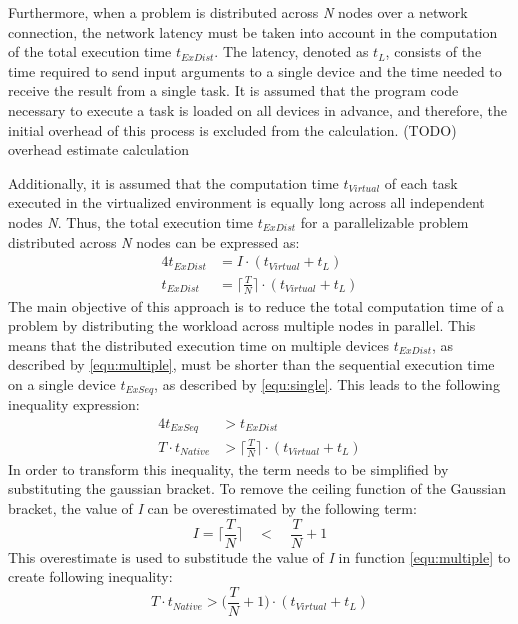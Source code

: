 Furthermore, when a problem is distributed across \emph{N} nodes over a network connection, the network latency must be taken into account in the computation of the total execution time $t_{ExDist}$. The latency, denoted as $t_{L}$, consists of the time required to send input arguments to a single device and the time needed to receive the result from a single task. It is assumed that the program code necessary to execute a task is loaded on all devices in advance, and therefore, the initial overhead of this process is excluded from the calculation. 
(TODO) overhead estimate calculation

Additionally, it is assumed that the computation time $t_{Virtual}$ of each task executed in the virtualized environment is equally long across all independent nodes \emph{N}. Thus, the total execution time $t_{ExDist}$ for a parallelizable problem distributed across \emph{N} nodes can be expressed as:
\begin{alignat}{4}
  t_{ExDist} &= I \cdot (t_{Virtual} + t_{L}) \nonumber \\
  t_{ExDist} &= \bigg\lceil\frac{T}{N}\bigg\rceil \cdot (t_{Virtual} + t_{L})
  \label{equ:multiple}
\end{alignat}
The main objective of this approach is to reduce the total computation time of a problem by distributing the workload across multiple nodes in parallel. This means that the distributed execution time on multiple devices $t_{ExDist}$, as described by \eqref{equ:multiple}, must be shorter than the sequential execution time on a single device $t_{ExSeq}$, as described by \eqref{equ:single}. This leads to the following inequality expression:
\begin{alignat}{4}
  t_{ExSeq} &> t_{ExDist} \nonumber \\
  T \cdot t_{Native} &> \bigg\lceil\frac{T}{N}\bigg\rceil \cdot (t_{Virtual} + t_{L})
  \label{equ:compare}
\end{alignat}
In order to transform this inequality, the term needs to be simplified by substituting the gaussian bracket. To remove the ceiling function of the Gaussian bracket, the value of \emph{I} can be overestimated by the following term:
\begin{equation}
  I = \bigg\lceil\frac{T}{N}\bigg\rceil \quad < \quad \frac{T}{N} + 1
  \label{equ:frac2}
\end{equation}
This overestimate is used to substitude the value of \emph{I} in function \eqref{equ:multiple} to create following inequality:
\begin{equation}
  T \cdot t_{Native} > \bigg(\frac{T}{N} + 1\bigg) \cdot (t_{Virtual} + t_{L})
  \label{equ:substitution}
\end{equation}

